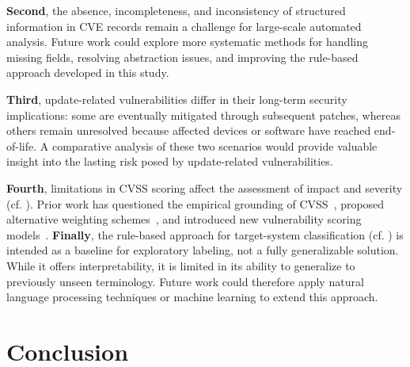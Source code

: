 \documentclass[fleqn,s1,names,tex]{neptune}
\begin{document}
\textbf{Second}, the absence, incompleteness, and inconsistency of structured information in CVE records remain a challenge for large-scale automated analysis. 
Future work could explore more systematic methods for handling missing fields, resolving abstraction issues, and improving the rule-based approach developed in this study.

\textbf{Third}, update-related vulnerabilities differ in their long-term security implications: some are eventually mitigated through subsequent patches, whereas others remain unresolved because affected devices or software have reached end-of-life. 
A comparative analysis of these two scenarios would provide valuable insight into the lasting risk posed by update-related vulnerabilities.

\textbf{Fourth}, limitations in CVSS scoring affect the assessment of impact and severity (cf. ). 
Prior work has questioned the empirical grounding of CVSS~\citep{9382369},
proposed alternative weighting schemes~\citep{10.1145/2491845.2491871}, and
introduced new vulnerability scoring models~\citep{9382369,10271793,280002}. 
 \textbf{Finally}, the rule-based approach for target-system classification (cf. ) is intended as a baseline for exploratory labeling, not a fully generalizable solution. While it offers interpretability, it is limited in its ability to generalize to previously unseen terminology. Future work could therefore apply natural language processing techniques or machine learning to extend this approach.


\section{Conclusion}
\end{document}
